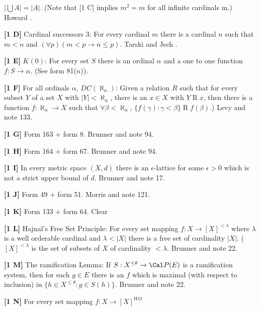$|\bigcup A| = |A|$. (Note that [1 C] implies $m^{2} =m$ for
all infinite cardinals m.)  \ac{Howard} \cite{1994}.
\smallskip
\item{}{\bf [1 D]} Cardinal successors 3: For every cardinal $m$ there is
a cardinal $n$ such that $m < n$ and $(\forall p)( m < p \rightarrow
n \le  p )$.  \ac{Tarski} \cite{1954a} and \ac{Jech} \cite{1966a}.
\smallskip
\item{}{\bf [1 E]}  $K(0)$:  For every
set $S$ there is an ordinal $\alpha$ and a one to one function
$f: S \rightarrow \alpha$. (See form 81($n$)).
\smallskip
\item{}{\bf [1 F]} For all ordinals $\alpha$, $DC(\aleph_{\alpha})$:
Given a relation $R$ such that for every subset $Y$ of a set $X$ with
$|Y| < \aleph_{\alpha}$, there is an $x \in X $ with $Y\mathrel R x$,
then there is a function $f:\aleph_{\alpha} \to X$ such that
$\forall\beta < \aleph_{\alpha}$, $\{f(\gamma):\gamma < \beta\}\mathrel R
f(\beta)$.)  \ac{Levy} \cite{1964} and note 133.
\smallskip
\item{}{\bf [1 G]}  Form 163 + form 8. \ac{Brunner} \cite{1982a} and
note 94.
\smallskip
\item{}{\bf [1 H]} Form 164 + form 67. \ac{Brunner} \cite{1982a} and
note 94.
\smallskip
\item{}{\bf [1 I]} In every metric space $(X,d)$ there is an
$\epsilon$-lattice for some $\epsilon >0$ which is not a strict upper
bound of $d$.  \ac{Brunner} \cite{1984e} and note 17.
\smallskip
\item{}{\bf [1 J]}  Form 49 $+$ form 51.  \ac{Morris} \cite{1969} and
note 121.
\smallskip
\item{}{\bf [1 K]}  Form 133 $+$ form 64.  Clear
\smallskip
\item{}{\bf [1 L]}  Hajnal's Free Set Principle:  For every set mapping
$f: X\rightarrow [X]^{<\lambda}$ where $\lambda$ is a well orderable
cardinal and $\lambda< |X|$ there is a free set of cardinality $|X|$.
($[X]^{<\lambda}$ is the set of subsets of $X$ of cardinality $<\lambda$.
\ac{Brunner} \cite{1989} and note 22. 
\smallskip
\item{}{\bf [1 M]}  The ramification Lemma: If $S: X^{\le\theta}
\rightarrow {\Cal P}(E)$ is a ramification system, then for each $g\in E$
there is an $f$ which is maximal (with respect to inclusion) in $\{h\in
X^{\le\theta}: g\in S(h)\}$. \ac{Brunner} \cite{1989} and note 22.
\smallskip
\item{}{\bf [1 N]}  For every set mapping $f: X\rightarrow [X]^{WO}$
